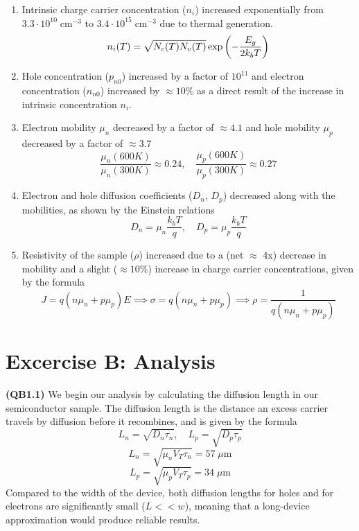 \documentclass{book}
\begin{document}
            \begin{enumerate}
                \item Intrinsic charge carrier concentration ($n_{i}$) increased exponentially from $3.3 \cdot 10^{10} \; \text{cm}^{-3}$ to $3.4 \cdot 10^{15} \; \text{cm}^{-3}$ due to thermal generation.
                \[
                    n_{i}(T) = \sqrt{N_{c}(T) N_{v}(T)} \exp\qty(-\frac{E_{g}}{2 k_{b} T})
                \]

                \item Hole concentration ($p_{n0}$) increased by a factor of $10^{11}$ and electron concentration ($n_{n0}$) increased by $\approx 10 \%$ as a direct result of the increase in intrinsic concentration $n_{i}$.

                \item Electron mobility $\mu_{n}$ decreased by a factor of $\approx 4.1$ and hole mobility $\mu_{p}$ decreased by a factor of $\approx 3.7$ 
                \[
                    \frac{\mu_{n}(600K)}{\mu_{n}(300K)} \approx 0.24, \quad \frac{\mu_{p}(600K)}{\mu_{p}(300K)} \approx 0.27
                \]

                \item Electron and hole diffusion coefficients ($D_{n}$, $D_{p}$) decreased along with the mobilities, as shown by the Einstein relations
                \[
                    D_{n} = \mu_{n} \frac{k_{b} T}{q}, \quad D_{p} = \mu_{p} \frac{k_{b} T}{q}
                \]

                \item Resistivity of the sample ($\rho$) increased due to a (net $\approx$ 4x) decrease in mobility and a slight ($\approx 10 \%$) increase in charge carrier concentrations, given by the formula
                \[
                    J = q( n \mu_{n} +  p \mu_{p}) E \implies \sigma = q (n \mu_{n} + p \mu_{p}) \implies \rho = \frac{1}{q (n \mu_{n} + p \mu_{p})}
                \]
            \end{enumerate}

        \newpage
        \section{Excercise B: Analysis}
            \textbf{(QB1.1)} We begin our analysis by calculating the diffusion length in our semiconductor sample.
            The diffusion length is the distance an excess carrier travels by diffusion before it recombines, and is given by the formula
            \[
                L_{n} = \sqrt{D_{n} \tau_{n}}, \quad L_{p} = \sqrt{D_{p} \tau_{p}} 
            \]
            \[
                L_{n} = \sqrt{\mu_{n} V_{T} \tau_{n}} = 57 \; \mu\text{m}
            \]
            \[
                L_{p} = \sqrt{\mu_{p} V_{T} \tau_{p}} = 34 \; \mu\text{m}
            \]
            Compared to the width of the device, both diffusion lengths for holes and for electrons are significantly small ($L << w$), meaning that a long-device approximation would produce reliable results.
\end{document}

